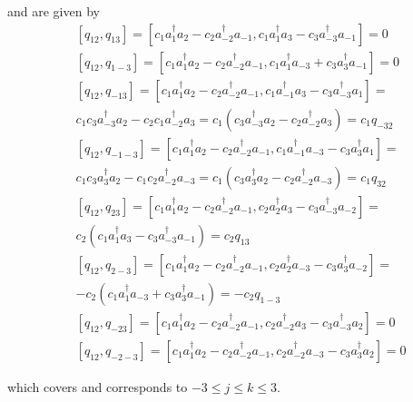 \documentclass[aps,preprint]{revtex4}%
\begin{document}
and are given by%
\begin{align}
&  \left[  q_{12},q_{13}\right]  =\left[  c_{1}a_{1}^{\dagger}a_{2}%
-c_{2}a_{-2}^{\dagger}a_{-1},c_{1}a_{1}^{\dagger}a_{3}-c_{3}a_{-3}^{\dagger
}a_{-1}\right]  =0\nonumber\\
&  \left[  q_{12},q_{1-3}\right]  =\left[  c_{1}a_{1}^{\dagger}a_{2}%
-c_{2}a_{-2}^{\dagger}a_{-1},c_{1}a_{1}^{\dagger}a_{-3}+c_{3}a_{3}^{\dagger
}a_{-1}\right]  =0\nonumber\\
&  \left[  q_{12},q_{-13}\right]  =\left[  c_{1}a_{1}^{\dagger}a_{2}%
-c_{2}a_{-2}^{\dagger}a_{-1},c_{1}a_{-1}^{\dagger}a_{3}-c_{3}a_{-3}^{\dagger
}a_{1}\right]  =\nonumber\\
&  c_{1}c_{3}a_{-3}^{\dagger}a_{2}-c_{2}c_{1}a_{-2}^{\dagger}a_{3}%
=c_{1}\left(  c_{3}a_{-3}^{\dagger}a_{2}-c_{2}a_{-2}^{\dagger}a_{3}\right)
=c_{1}q_{-32}\nonumber\\
&  \left[  q_{12},q_{-1-3}\right]  =\left[  c_{1}a_{1}^{\dagger}a_{2}%
-c_{2}a_{-2}^{\dagger}a_{-1},c_{1}a_{-1}^{\dagger}a_{-3}-c_{3}a_{3}^{\dagger
}a_{1}\right]  =\nonumber\\
&  c_{1}c_{3}a_{3}^{\dagger}a_{2}-c_{1}c_{2}a_{-2}^{\dagger}a_{-3}%
=c_{1}\left(  c_{3}a_{3}^{\dagger}a_{2}-c_{2}a_{-2}^{\dagger}a_{-3}\right)
=c_{1}q_{32}\nonumber\\
&  \left[  q_{12},q_{23}\right]  =\left[  c_{1}a_{1}^{\dagger}a_{2}%
-c_{2}a_{-2}^{\dagger}a_{-1},c_{2}a_{2}^{\dagger}a_{3}-c_{3}a_{-3}^{\dagger
}a_{-2}\right]  =\nonumber\\
&  c_{2}\left(  c_{1}a_{1}^{\dagger}a_{3}-c_{3}a_{-3}^{\dagger}a_{-1}\right)
=c_{2}q_{13}\nonumber\\
&  \left[  q_{12},q_{2-3}\right]  =\left[  c_{1}a_{1}^{\dagger}a_{2}%
-c_{2}a_{-2}^{\dagger}a_{-1},c_{2}a_{2}^{\dagger}a_{-3}-c_{3}a_{3}^{\dagger
}a_{-2}\right]  =\nonumber\\
&  -c_{2}\left(  c_{1}a_{1}^{\dagger}a_{-3}+c_{3}a_{3}^{\dagger}a_{-1}\right)
=-c_{2}q_{1-3}\nonumber\\
&  \left[  q_{12},q_{-23}\right]  =\left[  c_{1}a_{1}^{\dagger}a_{2}%
-c_{2}a_{-2}^{\dagger}a_{-1},c_{2}a_{-2}^{\dagger}a_{3}-c_{3}a_{-3}^{\dagger
}a_{2}\right]  =0\nonumber\\
&  \left[  q_{12},q_{-2-3}\right]  =\left[  c_{1}a_{1}^{\dagger}a_{2}%
-c_{2}a_{-2}^{\dagger}a_{-1},c_{2}a_{-2}^{\dagger}a_{-3}-c_{3}a_{3}^{\dagger
}a_{2}\right]  =0
\end{align}


which covers and corresponds to $-3\leq j\leq k\leq3.$
\end{document}
